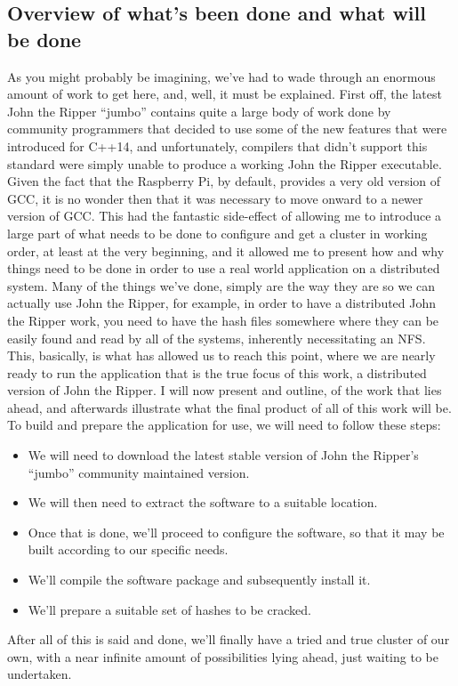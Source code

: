 \documentclass[]{article}
\begin{document}
        \subsection{Overview of what's been done and what will be done}
        As you might probably be imagining, we've had to wade through an enormous amount of work to get here, and, well, it must be explained. 
        First off, the latest John the Ripper ``jumbo'' contains quite a large body of work done by community programmers that decided to use 
        some of the new features that were introduced for C++14, and unfortunately, compilers that didn't support this standard were simply 
        unable to produce a working John the Ripper executable. Given the fact that the Raspberry Pi, by default, provides a very old version
        of GCC, it is no wonder then that it was necessary to move onward to a newer version of GCC. This had the fantastic side-effect of 
        allowing me to introduce a large part of what needs to be done to configure and get a cluster in working order, at least at the very 
        beginning, and it allowed me to present how and why things need to be done in order to use a real world application on a distributed 
        system. Many of the things we've done, simply are the way they are so we can actually use John the Ripper, for example, in order to 
        have a distributed John the Ripper work, you need to have the hash files somewhere where they can be easily found and read by all of 
        the systems, inherently necessitating an NFS. This, basically, is what has allowed us to reach this point, where we are nearly ready to 
        run the application that is the true focus of this work, a distributed version of John the Ripper. I will now present and outline, of 
        the work that lies ahead, and afterwards illustrate what the final product of all of this work will be. To build and prepare the 
        application for use, we will need to follow these steps:
        \begin{itemize}
        \item We will need to download the latest stable version of John the Ripper's ``jumbo'' community maintained version.
        \item We will then need to extract the software to a suitable location.
        \item Once that is done, we'll proceed to configure the software, so that it may be built according to our specific needs.
        \item We'll compile the software package and subsequently install it.
        \item We'll prepare a suitable set of hashes to be cracked.
        \end{itemize}
        After all of this is said and done, we'll finally have a tried and true cluster of our own, with a near infinite amount of 
        possibilities lying ahead, just waiting to be undertaken.
\end{document}
